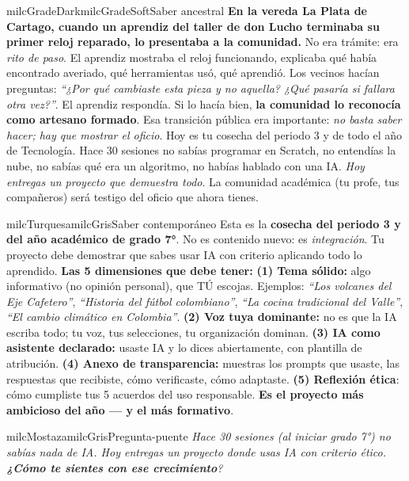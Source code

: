\documentclass[11pt,letterpaper]{article}
\begin{document}
\begin{softbox}{milcGradeDark}{milcGradeSoft}{Saber ancestral}
\textbf{En la vereda La Plata de Cartago, cuando un aprendiz del taller de don Lucho terminaba su primer reloj reparado, lo presentaba a la comunidad.} No era trámite: era \emph{rito de paso}. El aprendiz mostraba el reloj funcionando, explicaba qué había encontrado averiado, qué herramientas usó, qué aprendió. Los vecinos hacían preguntas: \emph{``¿Por qué cambiaste esta pieza y no aquella? ¿Qué pasaría si fallara otra vez?''}. El aprendiz respondía. Si lo hacía bien, \textbf{la comunidad lo reconocía como artesano formado}. Esa transición pública era importante: \emph{no basta saber hacer; hay que mostrar el oficio}. Hoy es tu cosecha del periodo 3 y de todo el año de Tecnología. Hace 30 sesiones no sabías programar en Scratch, no entendías la nube, no sabías qué era un algoritmo, no habías hablado con una IA. \emph{Hoy entregas un proyecto que demuestra todo}. La comunidad académica (tu profe, tus compañeros) será testigo del oficio que ahora tienes.
\end{softbox}

\begin{softbox}{milcTurquesa}{milcGris}{Saber contemporáneo}
Esta es la \textbf{cosecha del periodo 3 y del año académico de grado 7°}. No es contenido nuevo: es \emph{integración}. Tu proyecto debe demostrar que sabes usar IA con criterio aplicando todo lo aprendido. \textbf{Las 5 dimensiones que debe tener:} \textbf{(1) Tema sólido:} algo informativo (no opinión personal), que TÚ escojas. Ejemplos: \emph{``Los volcanes del Eje Cafetero''}, \emph{``Historia del fútbol colombiano''}, \emph{``La cocina tradicional del Valle''}, \emph{``El cambio climático en Colombia''}. \textbf{(2) Voz tuya dominante:} no es que la IA escriba todo; tu voz, tus selecciones, tu organización dominan. \textbf{(3) IA como asistente declarado:} usaste IA y lo dices abiertamente, con plantilla de atribución. \textbf{(4) Anexo de transparencia:} muestras los prompts que usaste, las respuestas que recibiste, cómo verificaste, cómo adaptaste. \textbf{(5) Reflexión ética}: cómo cumpliste tus 5 acuerdos del uso responsable. \textbf{Es el proyecto más ambicioso del año --- y el más formativo}.
\end{softbox}

\begin{softbox}{milcMostaza}{milcGris}{Pregunta-puente}
\textit{Hace 30 sesiones (al iniciar grado 7°) \emph{no sabías nada de IA}. Hoy entregas un proyecto donde usas IA con criterio ético. \textbf{¿Cómo te sientes con ese crecimiento}?}
\end{softbox}
\end{document}
